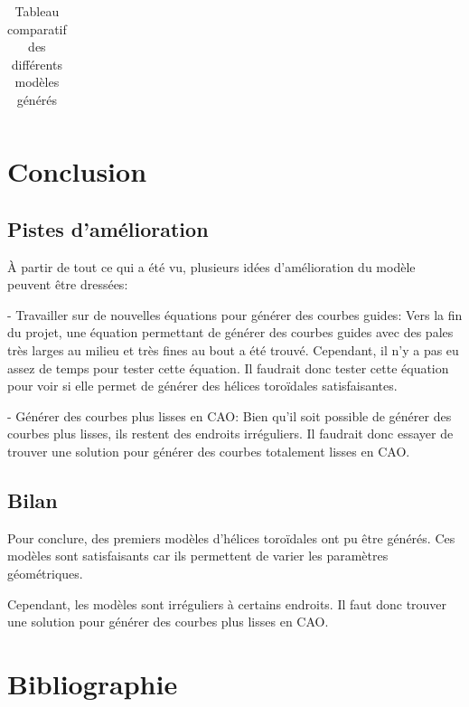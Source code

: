 \documentclass{article}
\begin{document}
\begin{table}[H]
\begin{tabular}{|c|c|c|}
        \hline
    \end{tabular}
    \caption{Tableau comparatif des différents modèles générés}
    \label{tab:my_label}
\end{table}

\section{Conclusion}

\subsection{Pistes d'amélioration}

À partir de tout ce qui a été vu, plusieurs idées d'amélioration du modèle peuvent être dressées:

- Travailler sur de nouvelles équations pour générer des courbes guides: Vers la fin du projet, une équation permettant de générer des courbes guides avec des pales très larges au milieu et très fines au bout a été trouvé. Cependant, il n'y a pas eu assez de temps pour tester cette équation. Il faudrait donc tester cette équation pour voir si elle permet de générer des hélices toroïdales satisfaisantes.

- Générer des courbes plus lisses en CAO: Bien qu'il soit possible de générer des courbes plus lisses, ils restent des endroits irréguliers. Il faudrait donc essayer de trouver une solution pour générer des courbes totalement lisses en CAO.

\subsection{Bilan}

Pour conclure, des premiers modèles d'hélices toroïdales ont pu être générés. Ces modèles sont satisfaisants car ils permettent de varier les paramètres géométriques.

Cependant, les modèles sont irréguliers à certains endroits. Il faut donc trouver une solution pour générer des courbes plus lisses en CAO.

\section{Bibliographie}
\end{document}
